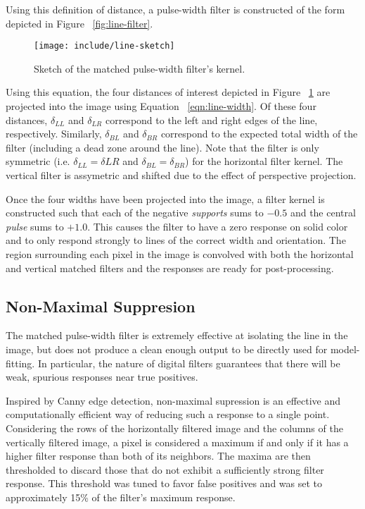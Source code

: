 \documentclass[11pt,twocolumn]{article}
\begin{document}
Using this definition of distance, a pulse-width filter is constructed of the
form depicted in Figure ~\ref{fig:line-filter}.

\begin{figure}
	\centering
	\texttt{[image: include/line-sketch]}
	\caption{Sketch of the matched pulse-width filter's kernel.}
	\label{fig:line-sketch}
\end{figure}

Using this equation, the four distances of interest depicted in Figure
~\ref{fig:line-sketch} are projected into the image using Equation
~\ref{eqn:line-width}. Of these four distances, $\delta_{LL}$ and $\delta_{LR}$
correspond to the left and right edges of the line, respectively. Similarly,
$\delta_{BL}$ and $\delta_{BR}$ correspond to the expected total width of the
filter (including a dead zone around the line). Note that the filter is only
symmetric (i.e. $\delta_{LL} = \delta{LR}$ and $\delta_{BL} = \delta_{BR}$) for
the horizontal filter kernel. The vertical filter is assymetric and shifted due
to the effect of perspective projection.

Once the four widths have been projected into the image, a filter kernel is
constructed such that each of the negative \textit{supports} sums to $-0.5$
and the central \textit{pulse} sums to $+1.0$. This causes the filter to have
a zero response on solid color and to only respond strongly to lines of the
correct width and orientation. The region surrounding each pixel in the image
is convolved with both the horizontal and vertical matched filters and the
responses are ready for post-processing.

\subsection{Non-Maximal Suppresion}
\label{sec:line-max}
The matched pulse-width filter is extremely effective at isolating the line in
the image, but does not produce a clean enough output to be directly used for
model-fitting. In particular, the nature of digital filters guarantees that
there will be weak, spurious responses near true positives.

Inspired by Canny edge detection, non-maximal supression is an effective and
computationally efficient way of reducing such a response to a single point.
Considering the rows of the horizontally filtered image and the columns of the
vertically filtered image, a pixel is considered a maximum if and only if it
has a higher filter response than both of its neighbors. The maxima are then
thresholded to discard those that do not exhibit a sufficiently strong filter
response. This threshold was tuned to favor false positives and was set to
approximately 15\% of the filter's maximum response.
\end{document}
